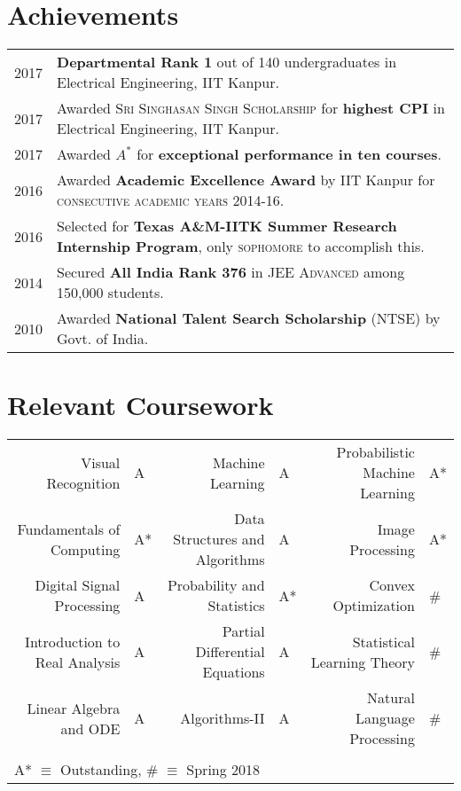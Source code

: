 \documentclass[a4paper,10pt]{article}
\begin{document}
\section{Achievements}
\begin{tabular}{rl}
2017 & \textbf{Departmental Rank 1} out of 140 undergraduates in Electrical
Engineering, IIT Kanpur.\\
2017 & Awarded \textsc{Sri Singhasan Singh Scholarship} for \textbf{highest CPI} in Electrical Engineering, IIT Kanpur.\\
2017 & Awarded $A^*$ for \textbf{exceptional performance in ten courses}.\\
2016 & Awarded \textbf{Academic Excellence Award} by IIT Kanpur for \textsc{consecutive academic years 2014-16}.\\
2016 & Selected for \textbf{Texas A\&M-IITK Summer Research Internship Program}, only \textsc{sophomore} to accomplish this.\\
2014 & Secured \textbf{All India Rank 376} in \textsc{JEE Advanced} among 150,000 students.\\
2010 & Awarded \textbf{National Talent Search Scholarship} (NTSE) by Govt. of India.

\end{tabular}
\section{Relevant Coursework}
\centering
\begin{tabular}{rl|rl|rl}
Visual Recognition & A & Machine Learning & A & Probabilistic Machine Learning & A*\\
Fundamentals of Computing & A* & Data Structures and Algorithms & A & Image Processing & A*\\
Digital Signal Processing & A & Probability and Statistics & A* & Convex Optimization & \#\\
Introduction to Real Analysis & A & Partial Differential Equations & A & Statistical Learning Theory & \#\\
Linear Algebra and ODE & A & Algorithms-II & A & Natural Language Processing & \#\\ \\

\multicolumn{4}{l}{\footnotesize A* $\equiv$ Outstanding, \# $\equiv$ Spring 2018}\\
\end{tabular}
\end{document}
